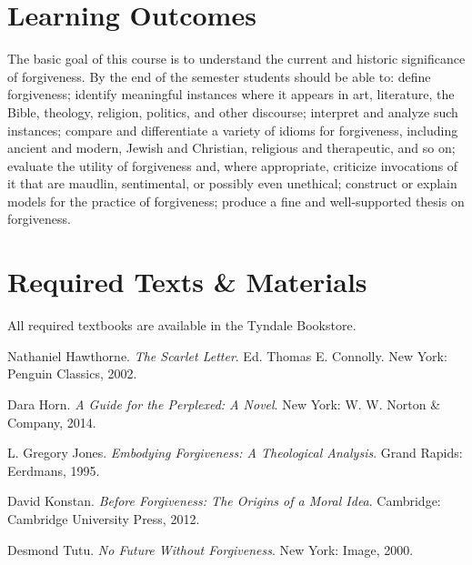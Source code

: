\documentclass[titlepage]{article}
\newcommand\incl{../includes}
\begin{document}


\section{Learning Outcomes}
\label{outcomes}

The basic goal of this course is to understand the current and historic
significance of forgiveness. By the end of the semester students should
be able to:
	define forgiveness;
	identify meaningful instances where it appears in art, literature,
	the Bible, theology, religion, politics, and other discourse;
	interpret and analyze such instances;
	compare and differentiate a variety of idioms for forgiveness,
	including ancient and modern, Jewish and Christian, religious and
	therapeutic, and so on;
	evaluate the utility of forgiveness and, where appropriate,
	criticize invocations of it that are maudlin, sentimental, or
	possibly even unethical;
	construct or explain models for the practice of forgiveness;
	produce a fine and well-supported thesis on forgiveness.

\section{Required Texts \& Materials}
\label{texts}

All required textbooks are available in the Tyndale Bookstore.

\begingroup
\renewcommand{\section}[2]{}%
\begin{thebibliography}{Hawthorne}%

	 Nathaniel Hawthorne. \emph{The
	Scarlet Letter}. Ed. Thomas E. Connolly. New York: Penguin Classics,
	2002.

	 Dara Horn. \emph{A Guide for the Perplexed: A
	Novel}. New York: W. W. Norton \& Company, 2014.

     L. Gregory Jones. \emph{Embodying
    Forgiveness: A Theological Analysis}. Grand Rapids: Eerdmans, 1995.

	 David Konstan. \emph{Before Forgiveness:
	The Origins of a Moral Idea}. Cambridge: Cambridge University Press,
	2012.

     Desmond Tutu. \emph{No Future Without
    Forgiveness}. New York: Image, 2000.

\end{thebibliography}
\endgroup
\end{document}
